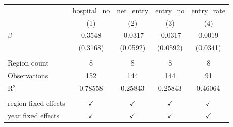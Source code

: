 \begingroup
\centering
\begin{tabular}{lcccc}
   \toprule
                        & hospital\_no  & net\_entry    & entry\_no     & entry\_rate\\   
                        & (1)           & (2)           & (3)           & (4)\\  
   \midrule 
   $\beta$              & 0.3548        & -0.0317       & -0.0317       & 0.0019\\   
                        & (0.3168)      & (0.0592)      & (0.0592)      & (0.0341)\\   
    \\
   Region count         & 8           & 8           & 8           & 8\\
   Observations         & 152           & 144           & 144           & 91\\  
   R$^2$                & 0.78558       & 0.25843       & 0.25843       & 0.46064\\  
    \\
   region fixed effects & $\checkmark$  & $\checkmark$  & $\checkmark$  & $\checkmark$\\   
   year fixed effects   & $\checkmark$  & $\checkmark$  & $\checkmark$  & $\checkmark$\\   
   \bottomrule
\end{tabular}
\par\endgroup
